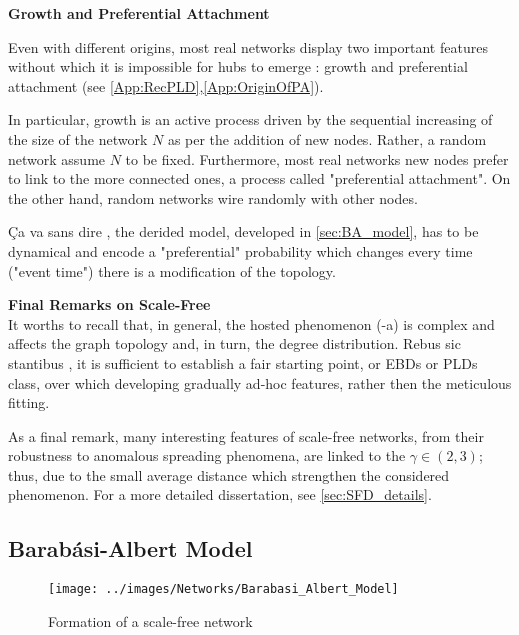 \documentclass[a4paper,10pt]{book} %
\theoremstyle{definition}
\begin{document}
{\large \textbf{Growth and Preferential Attachment}} 

Even with different origins, most real networks display two important features without which it is impossible for hubs to emerge \cite{barabasi::2016networkbook}: growth and preferential attachment (see \autoref{App:RecPLD},\autoref{App:OriginOfPA}). 

In particular, growth is an active process driven by the sequential increasing of the size of the network $N$ as per the addition of new nodes. Rather, a random network assume $N$ to be fixed. \newline
Furthermore, most real networks new nodes prefer to link to the more connected ones, a process called "preferential attachment". On the other hand, random networks wire randomly with other nodes.

Ça va sans dire \label{cit:A.Marzo}, the derided model, developed in \autoref{sec:BA_model}, has to be dynamical and encode a "preferential" probability which changes every time ("event time") there is a modification of the topology. 

{\large \textbf{Final Remarks on Scale-Free}} \\
It worths to recall that, in general, the hosted phenomenon (-a) is complex and affects the graph topology and, in turn, the degree distribution. Rebus sic stantibus \label{cit:D.Massa}, it is sufficient to establish a fair starting point, or EBDs or PLDs class, over which developing gradually ad-hoc features, rather then the meticulous fitting.

As a final remark, many interesting features of scale-free networks, from their robustness to anomalous spreading phenomena, are linked to the $\gamma \in (2,3)$; thus, due to the small average distance which strengthen the considered phenomenon.
For a more detailed dissertation, see \autoref{sec:SFD_details}.

\newpage
\subsection{Barabási-Albert Model}
\begin{figure}[ht]
	\texttt{[image: ../images/Networks/Barabasi\_Albert\_Model]}
	\centering
	\caption{Formation of a scale-free network \cite{Barabasi:2009_SF_DecadeBeyond}}
	\label{fig:LCD_growth}
\end{figure}
\end{document}
